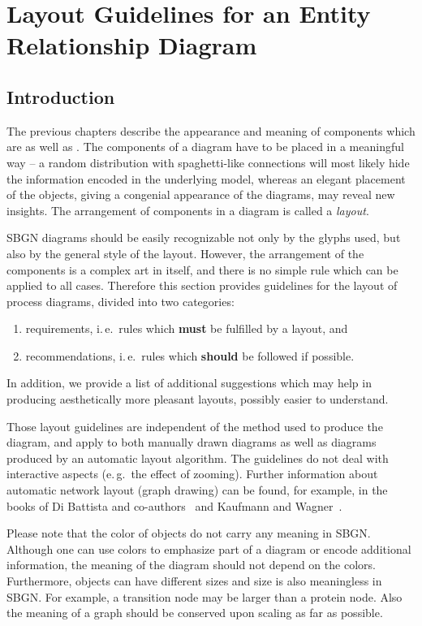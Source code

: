 \chapter{Layout Guidelines for an Entity Relationship Diagram}
\label{chp:layout}

\section{Introduction}

The previous chapters describe the appearance and meaning of \SBGNERLone components which are  as well as . The components of a \ER diagram have to be placed in a meaningful way -- a random distribution with spaghetti-like connections will most likely hide the information encoded in the underlying model, whereas an elegant placement of the objects, giving a congenial appearance of the diagrams, may reveal new insights. The arrangement of components in a diagram is called a \emph{layout}.

SBGN \ER diagrams should be easily recognizable not only by the glyphs used, but also by the general style of the layout. However, the arrangement of the components is a complex art in itself, and there is no simple rule which can be applied to all cases. Therefore this section provides guidelines for the layout of process diagrams, divided into two categories:
\begin{enumerate}
  \item requirements, i.\,e.~rules which \textbf{must} be fulfilled by a layout, and
  \item recommendations, i.\,e.~rules which \textbf{should} be followed if possible.
\end{enumerate}
In addition, we provide a list of additional suggestions which may help in producing aesthetically more pleasant layouts, possibly easier to understand.

Those layout guidelines are independent of the method used to produce the diagram, and apply to both manually drawn diagrams as well as diagrams produced by an automatic layout algorithm. The guidelines do not deal with interactive aspects (e.\,g.~the effect of zooming). Further information about automatic network layout (graph drawing) can be found, for example, in the books of Di Battista and co-authors~\cite{DiBattista:1998} and Kaufmann and Wagner~\cite{Kaufmann:2001}.

Please note that the color of objects do not carry any meaning in SBGN. Although one can use colors to emphasize part of a diagram or encode additional information, the meaning of the diagram should not depend on the colors. Furthermore, objects can have different sizes and size is also meaningless in SBGN. For example, a transition node may be larger than a protein node. Also the meaning of a graph should be conserved upon scaling as far as possible.

